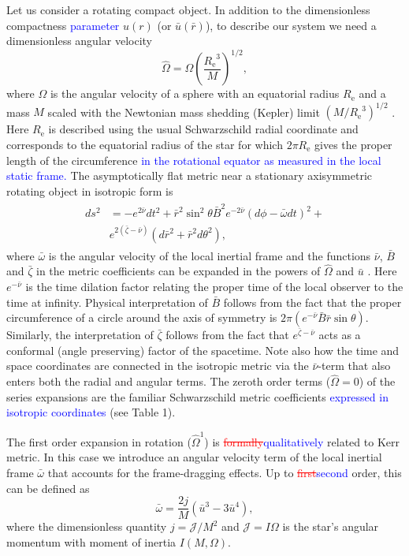 \documentclass{aa}
\newcommand{\be}{\begin{equation}}
\newcommand{\ee}{\end{equation}}
\newcommand{\refe}[1]{\textcolor{blue}{{#1}}}
\newcommand{\refedel}[1]{\textcolor{red}{\sout{#1}}}
\newcommand{\Req}{\ensuremath{R_{\mathrm{e}}}}
\newcommand{\sch}{Schwarzschild }
\newcommand{\rb}{\ensuremath{\bar{r}}}
\newcommand{\ub}{\ensuremath{\bar{u}}}
\newcommand{\wb}{\ensuremath{\bar{\omega}}}
\newcommand{\Ob}{\ensuremath{\hat{\Omega}}}
\newcommand{\nub}{\ensuremath{\bar{\nu}}}
\newcommand{\zetab}{\ensuremath{\bar{\zeta}}}
\newcommand{\Bb}{\ensuremath{\bar{B}}}
\begin{document}
Let us consider a rotating compact object.
In addition to the dimensionless compactness \refe{parameter} $u(r)$ (or $\ub(\rb)$), to describe our system we need a dimensionless angular velocity
\be
\Ob = \Omega \left( \frac{\Req^3}{M} \right)^{1/2},
\ee
where $\Omega$ is the angular velocity of a sphere with an equatorial radius $\Req$ and a mass $M$ scaled with the Newtonian mass shedding (Kepler) limit $(M/\Req^3)^{1/2}$ \citep[see][p.29]{rcs}.  
Here $\Req$ is described using the usual \sch radial coordinate and corresponds to the equatorial radius of the star for which $2\pi\Req$ gives the proper length of the circumference \refe{in the rotational equator as measured in the local static frame.}
The asymptotically flat metric near a stationary axisymmetric rotating object in isotropic form is \citep{BW71} 
\begin{align}\begin{split} \label{eq:BWmetric}
ds^2 & = -e^{2\nub} dt^2 +
     \rb^2 \sin^2\theta \Bb^2 e^{-2\nub}(d\phi - \wb dt)^2 + \\
     & e^{2(\zetab-\nub)}(d\rb^2 + \rb^2d\theta^2),
\end{split}\end{align}
where $\wb$ is the angular velocity of the local inertial frame and the functions $\nub$, $\Bb$ and $\zetab$ in the metric coefficients can be expanded in the powers of $\Ob$ and $\ub$ \citep{BI76}.
Here $e^{-\nub}$ is the time dilation factor relating the proper time of the local observer to the time at infinity.
Physical interpretation of $\Bb$ follows from the fact that the proper circumference of a circle around the axis of symmetry is $2\pi(e^{-\nub} \Bb \rb \sin\theta)$.
Similarly, the interpretation of $\zetab$ follows from the fact that $e^{\zetab - \nub}$ acts as a conformal (angle preserving) factor of the spacetime. %
Note also how the time and space coordinates are connected in the isotropic metric via the $\nub$-term that also enters both the radial and angular terms.
The zeroth order terms ($\Ob = 0$) of the series expansions are the familiar \sch metric coefficients \refe{expressed in isotropic coordinates} (see Table 1).

The first order expansion in rotation ($\Ob^1$) is \refedel{formally}\refe{qualitatively} related to Kerr metric.
In this case we introduce an angular velocity term of the local inertial frame $\wb$ that accounts for the frame-dragging effects. 
Up to \refedel{first}\refe{second} order, this can be defined as
\be\label{eq:wbar}
\wb = \frac{2 j}{M} (\ub^3 - 3\ub^4),
\ee
where the dimensionless quantity $j=\mathcal{J}/M^2$ and $\mathcal{J} = I \Omega$ is the star's angular momentum with moment of inertia $I(M,\Omega)$.
\end{document}
